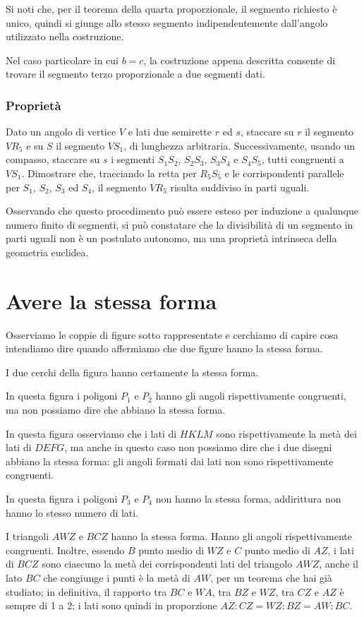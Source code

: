 Si noti che, per il teorema della quarta proporzionale, il segmento richiesto è unico, quindi si giunge allo stesso segmento indipendentemente dall'angolo utilizzato nella costruzione. 

Nel caso particolare in cui $b = c$, la costruzione appena descritta consente di trovare il segmento terzo proporzionale a due segmenti dati.

\subsubsection{Proprietà}

Dato un angolo di vertice $V$ e lati due semirette $r$ ed $s$, staccare su $r$ il segmento $VR_5$ e su $S$ il segmento $VS_1$, di lunghezza arbitraria. Successivamente, usando un compasso, staccare su $s$ i segmenti $S_1S_2$, $S_2S_3$, $S_3S_4$ e $S_4S_5$, tutti congruenti a $VS_1$. Dimostrare che, tracciando la retta per $R_5S_5$ e le corrispondenti parallele per $S_1$, $S_2$, $S_3$ ed $S_4$, il segmento $VR_5$ risulta suddiviso in parti uguali.

Osservando che questo procedimento può essere esteso per induzione a qualunque numero finito di segmenti, si può constatare che la divisibilità di un segmento in parti uguali non è un postulato autonomo, ma una proprietà intrinseca della geometria euclidea.


\section{Avere la stessa forma}

Osserviamo le coppie di figure sotto rappresentate e cerchiamo di capire cosa intendiamo dire quando affermiamo che due figure hanno  la stessa forma.

I due cerchi della figura hanno certamente la stessa forma.

In questa figura i poligoni $P_1$ e $P_2$ hanno gli angoli rispettivamente congruenti, ma non possiamo dire che abbiano la stessa forma.

In questa figura osserviamo che i lati di $HKLM$ sono rispettivamente la metà dei lati di $DEFG$, ma anche in questo caso non possiamo dire che i due disegni abbiano la stessa forma: gli angoli formati dai lati non sono rispettivamente congruenti.

In questa figura i poligoni $P_3$ e $P_4$ non hanno la stessa forma, addirittura non hanno lo stesso numero di lati.

I triangoli $AWZ$ e $BCZ$ hanno la stessa forma. Hanno gli angoli rispettivamente congruenti. Inoltre, essendo $B$ punto medio di $WZ$ e $C$ punto medio di $AZ$, i lati di $BCZ$ sono ciascuno la metà dei corrispondenti lati del triangolo $AWZ$, anche il lato $BC$ che congiunge i punti è la metà di $AW$, per un teorema che hai già studiato; in definitiva, il rapporto tra $BC$ e $WA$, tra $BZ$ e $WZ$, tra $CZ$ e $AZ$ è sempre di 1 a 2; i lati sono quindi in proporzione  $AZ : CZ = WZ : BZ = AW : BC$.

